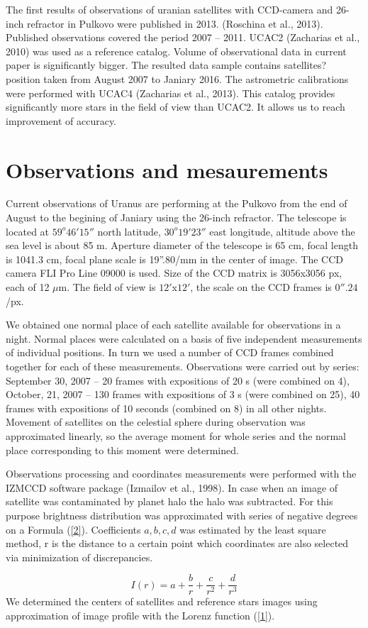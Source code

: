 \documentclass[]{article}
\begin{document}
The first results of observations of uranian satellites with CCD-camera and 26-inch refractor in Pulkovo were published in 2013. (Roschina et al., 2013). Published observations covered the period  2007 -- 2011. UCAC2 (Zacharias et al., 2010) was used as a reference catalog. Volume of observational data in current paper is significantly bigger. The resulted data sample contains satellites? position taken from August 2007 to Janiary 2016. The astrometric calibrations were performed with UCAC4 (Zacharias et al., 2013). This catalog provides significantly more stars in the field of view than UCAC2. It allows us to reach improvement of accuracy.

\section{Observations and mesaurements}
Current observations of Uranus are performing at the Pulkovo from the end of August to the begining of Janiary using the 26-inch refractor. The telescope is located at $59^o46' 15''$ north latitude, $30^o19'23''$ east longitude, altitude above the sea level is about 85 m. Aperture diameter of the telescope is 65 cm, focal length is 1041.3 cm, focal plane scale is 19''.80/mm in the center of image. The CCD camera FLI Pro Line 09000 is used. Size of the CCD matrix is 3056x3056 px, each of 12 $\mu$m. The field of view is $12'$x$12'$, the scale on the CCD frames is $0''.24$/px.\par
We obtained one normal place of each satellite available for observations in a night. Normal places were calculated on a basis of five independent measurements of individual positions. In turn we used a number of CCD frames combined together for each of these measurements. Observations were carried out by series: September 30, 2007 -- 20 frames with expositions of 20 s (were combined on 4), October, 21, 2007 -- 130 frames with expositions of 3 s (were combined on 25), 40 frames with expositions of 10 seconds (combined on 8) in all other nights. Movement of satellites on the celestial sphere during observation was approximated linearly, so the average moment for whole series and the normal place corresponding to this moment were determined.\par
Observations processing and coordinates measurements were performed with the IZMCCD software package (Izmailov et al., 1998). In case when an image of satellite was contaminated by planet halo the halo was subtracted. For this purpose brightness distribution was approximated with series of negative degrees on a Formula (\ref{2}). Coefficients $a, b, c, d$ was estimated by the least square method, r is the distance to a certain point which coordinates are also selected via minimization of discrepancies.\par
\begin{equation}
\label{2}
I(r) = a + \frac{b}{r} + \frac{c}{r^2} + \frac{d}{r^3}
\end{equation}
We determined the centers of satellites and reference stars images using approximation of image profile with the Lorenz function (\ref{1}).
\end{document}
